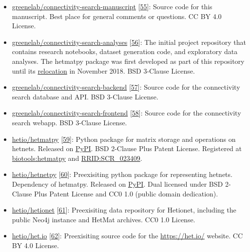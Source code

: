 \begin{itemize}
\tightlist
\item
  \href{https://github.com/greenelab/connectivity-search-manuscript}{greenelab/connectivity-search-manuscript}
  {[}\protect\hyperlink{ref-3KJWwgoz}{55}{]}:
  Source code for this manuscript.
  Best place for general comments or questions.
  CC BY 4.0 License.
\item
  \href{https://github.com/greenelab/connectivity-search-analyses}{greenelab/connectivity-search-analyses}
  {[}\protect\hyperlink{ref-eq4IX1LX}{56}{]}:
  The initial project repository that contains research notebooks, dataset generation code, and exploratory data analyses.
  The hetmatpy package was first developed as part of this repository until its \href{https://github.com/hetio/hetmatpy/issues/1}{relocation} in November 2018.
  BSD 3-Clause License.
\item
  \href{https://github.com/greenelab/connectivity-search-backend}{greenelab/connectivity-search-backend}
  {[}\protect\hyperlink{ref-ASx5cMWI}{57}{]}:
  Source code for the connectivity search database and API.
  BSD 3-Clause License.
\item
  \href{https://github.com/greenelab/connectivity-search-frontend}{greenelab/connectivity-search-frontend}
  {[}\protect\hyperlink{ref-CadAZTf2}{58}{]}:
  Source code for the connectivity search webapp.
  BSD 3-Clause License.
\item
  \href{https://github.com/hetio/hetmatpy}{hetio/hetmatpy}
  {[}\protect\hyperlink{ref-gHk6T3vn}{59}{]}:
  Python package for matrix storage and operations on hetnets.
  Released on \href{https://pypi.org/project/hetmatpy/}{PyPI}.
  BSD 2-Clause Plus Patent License.
  Registered at \href{https://bio.tools/hetmatpy}{biotools:hetmatpy} and \href{https://scicrunch.org/resolver/RRID:SCR_023409}{RRID:SCR\_023409}.
\item
  \href{https://github.com/hetio/hetnetpy}{hetio/hetnetpy}
  {[}\protect\hyperlink{ref-srnBddlB}{60}{]}:
  Preexisiting python package for representing hetnets.
  Dependency of hetmatpy.
  Released on \href{https://pypi.org/project/hetnetpy/}{PyPI}.
  Dual licensed under BSD 2-Clause Plus Patent License and CC0 1.0 (public domain dedication).
\item
  \href{https://github.com/hetio/hetionet}{hetio/hetionet}
  {[}\protect\hyperlink{ref-L9cBdipF}{61}{]}:
  Preexisiting data repository for Hetionet,
  including the public Neo4j instance and HetMat archives.
  CC0 1.0 License.
\item
  \href{https://github.com/hetio/het.io}{hetio/het.io}
  {[}\protect\hyperlink{ref-12IQq3W3u}{62}{]}:
  Preexisiting source code for the \url{https://het.io/} website.
  CC BY 4.0 License.
\end{itemize}

